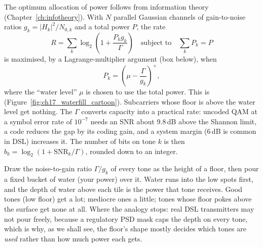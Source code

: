 The optimum allocation of power follows from information theory (Chapter~\ref{ch:infotheory}). With $N$
parallel Gaussian channels of gain-to-noise ratios $g_k=|H_k|^2/N_{0,k}$ and a total power $P$, the rate
\begin{equation}
R=\sum_k\log_2\!\left(1+\frac{P_kg_k}{\Gamma}\right)\quad\text{subject to}\quad\sum_kP_k=P
\end{equation}
is maximised, by a Lagrange-multiplier argument (box below), when
\begin{equation}
P_k=\left(\mu-\frac{\Gamma}{g_k}\right)^{\!+},
\label{eq:ch17:waterfill}
\end{equation}
where the ``water level'' $\mu$ is chosen to use the total power. This is 
(Figure~\ref{fig:ch17_waterfill_cartoon}). Subcarriers whose floor is above the water level get
nothing. The  $\Gamma$ converts capacity into a practical rate: uncoded QAM at a symbol
error rate of $10^{-7}$ needs an SNR about 9.8\,dB above the Shannon limit, a code reduces the gap by its
coding gain, and a system margin (6\,dB is common in DSL) increases it. The number of bits on tone $k$ is
then $b_k=\log_2(1+\text{SNR}_k/\Gamma)$, rounded down to an integer.

\begin{analogy}
Draw the noise-to-gain ratio $\Gamma/g_k$ of every tone as the height of a floor, then pour a fixed
bucket of water (your power) over it. Water runs into the low spots first, and the depth of water
above each tile is the power that tone receives. Good tones (low floor) get a lot; mediocre ones a
little; tones whose floor pokes above the surface get none at all. Where the analogy stops: real
DSL transmitters may not pour freely, because a regulatory PSD mask caps the depth on every tone,
which is why, as we shall see, the floor's shape mostly decides which tones are \emph{used} rather
than how much power each gets.
\end{analogy}



